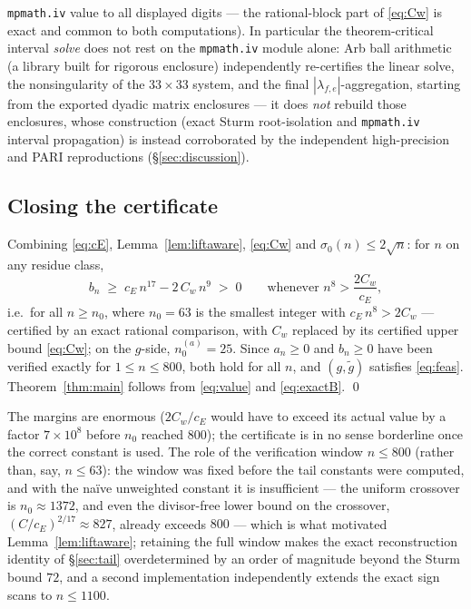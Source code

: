 \documentclass[11pt]{article}
\theoremstyle{remark}
\begin{document}
\texttt{mpmath.iv} value to all displayed digits --- the rational-block
part of \eqref{eq:Cw} is exact and common to both computations). In
particular the theorem-critical interval \emph{solve} does not rest on
the \texttt{mpmath.iv} module alone: Arb ball arithmetic (a library
built for rigorous enclosure) independently re-certifies the linear
solve, the nonsingularity of the $33\times33$ system, and the final
$|\lambda_{f,e}|$-aggregation, starting from the exported dyadic matrix
enclosures --- it does \emph{not} rebuild those enclosures, whose
construction (exact Sturm root-isolation and \texttt{mpmath.iv} interval
propagation) is instead corroborated by the independent high-precision
and PARI reproductions (\S\ref{sec:discussion}).

\subsection{Closing the certificate}

Combining \eqref{eq:cE}, Lemma~\ref{lem:liftaware}, \eqref{eq:Cw} and
$\sigma_0(n)\le2\sqrt n$: for $n$ on any residue class,
\[
b_n\;\ge\;c_E\,n^{17}-2\,C_w\,n^{9}\;>\;0
\qquad\text{whenever } n^{8}>\frac{2C_w}{c_E},
\]
i.e.\ for all $n\ge n_0$, where $n_0=63$ is the smallest integer with
$c_E\,n^8>2C_w$ --- certified by an exact rational comparison, with
$C_w$ replaced by its certified upper bound \eqref{eq:Cw}; on the
$g$-side, $n_0^{(a)}=25$. Since $a_n\ge0$ and $b_n\ge0$ have
been verified exactly for $1\le n\le800$, both hold for all $n$, and
$(g,\tilde g)$ satisfies \eqref{eq:feas}. Theorem~\ref{thm:main}
follows from \eqref{eq:value} and \eqref{eq:exactB}. \qed

The margins are enormous ($2C_w/c_E$ would have to exceed its actual
value by a factor $7\times10^{8}$ before $n_0$ reached $800$); the
certificate is in no sense borderline once the correct constant is used.
The role of the verification window $n\le800$ (rather than, say,
$n\le63$): the window was fixed before the tail constants were
computed, and with the na\"ive unweighted constant it is insufficient
--- the uniform crossover is $n_0\approx1372$, and even the
divisor-free lower bound on the crossover, $(C/c_E)^{2/17}\approx827$,
already exceeds $800$ --- which is what motivated
Lemma~\ref{lem:liftaware}; retaining the full window makes the exact
reconstruction identity of \S\ref{sec:tail} overdetermined by an order
of magnitude beyond the Sturm bound $72$, and a second implementation
independently extends the exact sign scans to $n\le1100$.
\end{document}
